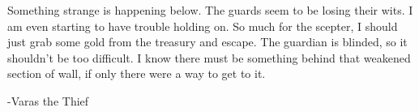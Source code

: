 \documentclass[white]{grimrock}
\begin{document}
\name{\wTreasury{}}

Something strange is happening below. The guards seem to be losing their wits. I am even starting to have trouble holding on. So much for the scepter, I should just grab some gold from the treasury and escape. The guardian is blinded, so it shouldn't be too difficult. I know there must be something behind that weakened section of wall, if only there were a way to get to it.

								-Varas the Thief
\end{document}
